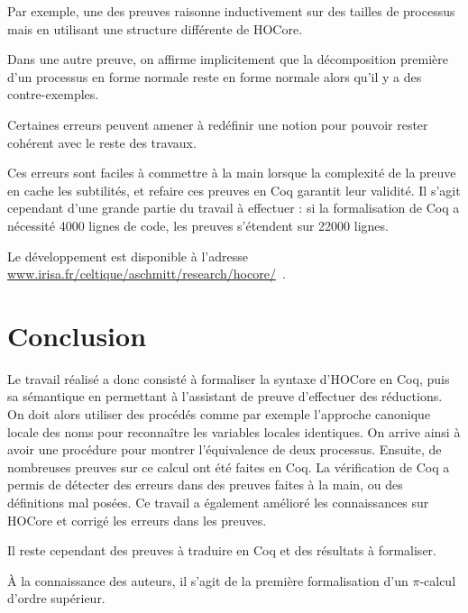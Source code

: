 \documentclass[11pt]{article}
\def\pic{$\pi$-calcul }
\begin{document}
Par exemple, une des preuves raisonne inductivement sur des tailles de processus mais en utilisant une structure différente de HOCore.

Dans une autre preuve, on affirme implicitement que la décomposition première d'un processus en forme normale reste en forme normale alors qu'il y a des contre-exemples.

Certaines erreurs peuvent amener à redéfinir une notion pour pouvoir rester cohérent avec le reste des travaux.

Ces erreurs sont faciles à commettre à la main lorsque la complexité de la preuve en cache les subtilités, et refaire ces preuves en Coq garantit leur validité. Il s'agit cependant d'une grande partie du travail à effectuer : si la formalisation de Coq a nécessité 4000 lignes de code, les preuves s'étendent sur 22000 lignes. 

Le développement est disponible à l'adresse \url{www.irisa.fr/celtique/aschmitt/research/hocore/}\ .

\section{Conclusion}
Le travail réalisé a donc consisté à formaliser la syntaxe d'HOCore en Coq, puis sa sémantique en permettant à l'assistant de preuve d'effectuer des réductions. 
On doit alors utiliser des procédés comme par exemple l'approche canonique locale des noms pour reconnaître les variables locales identiques.
On arrive ainsi à avoir une procédure pour montrer l'équivalence de deux processus. %
Ensuite, de nombreuses preuves sur ce calcul ont été faites en Coq. La vérification de Coq a permis de détecter des erreurs dans des preuves faites à la main, ou des définitions mal posées. Ce travail a également amélioré les connaissances sur HOCore et corrigé les erreurs dans les preuves.

Il reste cependant des preuves à traduire en Coq et des résultats à formaliser. %

À la connaissance des auteurs, il s'agit de la première formalisation d'un \pic d'ordre supérieur. 
\newpage


\end{document}
